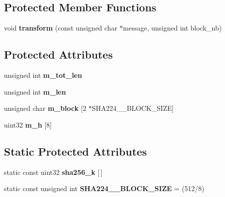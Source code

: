 \subsection*{Protected Member Functions}
\begin{DoxyCompactItemize}
\item 
\mbox{\label{class_s_h_a256_a97f83033c1ff262737e763aa89be9487}} 
void {\bfseries transform} (const unsigned char $\ast$message, unsigned int block\+\_\+nb)
\end{DoxyCompactItemize}
\subsection*{Protected Attributes}
\begin{DoxyCompactItemize}
\item 
\mbox{\label{class_s_h_a256_a322a3833dfe2b5b01f91e05fcab90177}} 
unsigned int {\bfseries m\+\_\+tot\+\_\+len}
\item 
\mbox{\label{class_s_h_a256_aa692469ace938c44a2fda98432e051cb}} 
unsigned int {\bfseries m\+\_\+len}
\item 
\mbox{\label{class_s_h_a256_aee6109fbc9d62b228e2c8f8203884660}} 
unsigned char {\bfseries m\+\_\+block} \mbox{[}2 $\ast$S\+H\+A224\+\_\+\_\+\+B\+L\+O\+C\+K\+\_\+\+S\+I\+ZE\mbox{]}
\item 
\mbox{\label{class_s_h_a256_a515335b007cd905b9e8a5b9e080687bb}} 
uint32 {\bfseries m\+\_\+h} \mbox{[}8\mbox{]}
\end{DoxyCompactItemize}
\subsection*{Static Protected Attributes}
\begin{DoxyCompactItemize}
\item 
static const uint32 {\bfseries sha256\+\_\+k} \mbox{[}$\,$\mbox{]}
\item 
\mbox{\label{class_s_h_a256_a2f94636534fc339f3210c12ec746bcb9}} 
static const unsigned int {\bfseries S\+H\+A224\+\_\+\_\+\+B\+L\+O\+C\+K\+\_\+\+S\+I\+ZE} = (512/8)
\end{DoxyCompactItemize}


